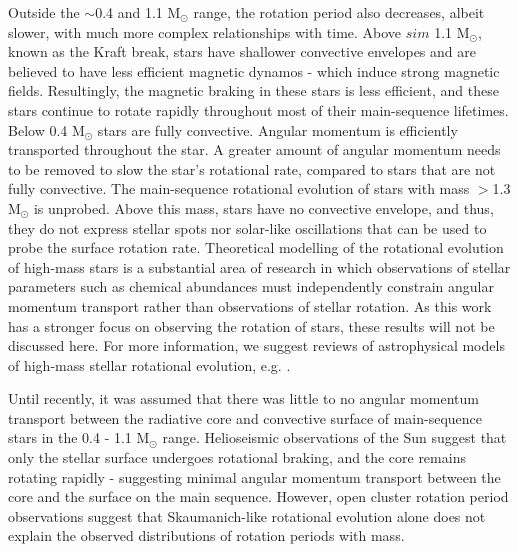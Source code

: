 Outside the $\sim$0.4 and 1.1 M$_{\odot}$ range, the rotation period also decreases, albeit slower, with much more complex relationships with time.
Above $sim$ 1.1 M$_{\odot}$, known as the Kraft break, stars have shallower convective envelopes and are believed to have less efficient magnetic dynamos - which induce strong magnetic fields.  
Resultingly, the magnetic braking in these stars is less efficient, and these stars continue to rotate rapidly throughout most of their main-sequence lifetimes. 
Below 0.4 M$_{\odot}$ stars are fully convective.
Angular momentum is efficiently transported throughout the star.
A greater amount of angular momentum needs to be removed to slow the star's rotational rate, compared to stars that are not fully convective.
The main-sequence rotational evolution of stars with mass $>$1.3 M$_{\odot}$ is unprobed.
Above this mass, stars have no convective envelope, and thus, they do not express stellar spots nor solar-like oscillations that can be used to probe the surface rotation rate.
Theoretical modelling of the rotational evolution of high-mass stars is a substantial area of research in which observations of stellar parameters such as chemical abundances must independently constrain angular momentum transport rather than observations of stellar rotation.
As this work has a stronger focus on observing the rotation of stars, these results will not be discussed here.
For more information, we suggest reviews of astrophysical models of high-mass stellar rotational evolution, e.g. \citet{heger_presupernova_1998,maeder_evolution_2000,maeder_physics_2009}.

Until recently, it was assumed that there was little to no angular momentum transport between the radiative core and convective surface of main-sequence stars in the 0.4 - 1.1 M$_{\odot}$ range. 
Helioseismic observations of the Sun suggest that only the stellar surface undergoes rotational braking, and the core remains rotating rapidly - suggesting minimal angular momentum transport between the core and the surface on the main sequence. 
However, open cluster rotation period observations suggest that Skaumanich-like rotational evolution alone does not explain the observed distributions of rotation periods with mass.


